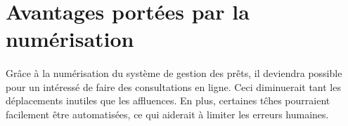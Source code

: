     \section{Avantages portées par la numérisation}
\paragraph{}
Grâce à la numérisation du système de gestion des prêts,
il deviendra possible pour un intéressé de faire des consultations
en ligne. Ceci diminuerait tant les déplacements inutiles que les 
affluences. En plus, certaines tĉhes pourraient facilement être 
automatisées, ce qui aiderait à limiter les erreurs humaines.   